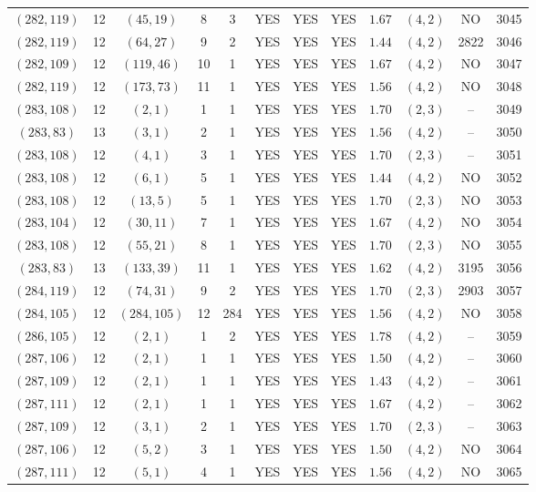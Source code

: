 \begin{longtable}{|c|c|c|c|c|c|c|c|c|c|c|c|}
$(282,119)$ & 12 & $(45,19)$ & 8 & 3 & YES & YES & YES & $1.67$ & $(4,2)$ & NO & 3045\\
$(282,119)$ & 12 & $(64,27)$ & 9 & 2 & YES & YES & YES & $1.44$ & $(4,2)$ & 2822 & 3046\\
$(282,109)$ & 12 & $(119,46)$ & 10 & 1 & YES & YES & YES & $1.67$ & $(4,2)$ & NO & 3047\\
$(282,119)$ & 12 & $(173,73)$ & 11 & 1 & YES & YES & YES & $1.56$ & $(4,2)$ & NO & 3048\\
$(283,108)$ & 12 & $(2,1)$ & 1 & 1 & YES & YES & YES & $1.70$ & $(2,3)$ & -- & 3049\\
$(283,83)$ & 13 & $(3,1)$ & 2 & 1 & YES & YES & YES & $1.56$ & $(4,2)$ & -- & 3050\\
$(283,108)$ & 12 & $(4,1)$ & 3 & 1 & YES & YES & YES & $1.70$ & $(2,3)$ & -- & 3051\\
$(283,108)$ & 12 & $(6,1)$ & 5 & 1 & YES & YES & YES & $1.44$ & $(4,2)$ & NO & 3052\\
$(283,108)$ & 12 & $(13,5)$ & 5 & 1 & YES & YES & YES & $1.70$ & $(2,3)$ & NO & 3053\\
$(283,104)$ & 12 & $(30,11)$ & 7 & 1 & YES & YES & YES & $1.67$ & $(4,2)$ & NO & 3054\\
$(283,108)$ & 12 & $(55,21)$ & 8 & 1 & YES & YES & YES & $1.70$ & $(2,3)$ & NO & 3055\\
$(283,83)$ & 13 & $(133,39)$ & 11 & 1 & YES & YES & YES & $1.62$ & $(4,2)$ & 3195 & 3056\\
$(284,119)$ & 12 & $(74,31)$ & 9 & 2 & YES & YES & YES & $1.70$ & $(2,3)$ & 2903 & 3057\\
$(284,105)$ & 12 & $(284,105)$ & 12 & 284 & YES & YES & YES & $1.56$ & $(4,2)$ & NO & 3058\\
$(286,105)$ & 12 & $(2,1)$ & 1 & 2 & YES & YES & YES & $1.78$ & $(4,2)$ & -- & 3059\\
$(287,106)$ & 12 & $(2,1)$ & 1 & 1 & YES & YES & YES & $1.50$ & $(4,2)$ & -- & 3060\\
$(287,109)$ & 12 & $(2,1)$ & 1 & 1 & YES & YES & YES & $1.43$ & $(4,2)$ & -- & 3061\\
$(287,111)$ & 12 & $(2,1)$ & 1 & 1 & YES & YES & YES & $1.67$ & $(4,2)$ & -- & 3062\\
$(287,109)$ & 12 & $(3,1)$ & 2 & 1 & YES & YES & YES & $1.70$ & $(2,3)$ & -- & 3063\\
$(287,106)$ & 12 & $(5,2)$ & 3 & 1 & YES & YES & YES & $1.50$ & $(4,2)$ & NO & 3064\\
$(287,111)$ & 12 & $(5,1)$ & 4 & 1 & YES & YES & YES & $1.56$ & $(4,2)$ & NO & 3065\\

\end{longtable}
